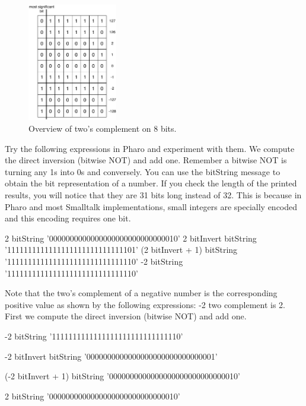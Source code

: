 \documentclass[a4paper,10pt,twoside]{book}
\begin{document}
\begin{figure}[h]
\begin{center}
\includegraphics[width=0.35\textwidth]{8bits-Table}
\caption{Overview of two's complement on 8 bits.\label{negativePositive}}
\end{center}
\end{figure}



Try the following expressions in Pharo and experiment with them. We compute the direct inversion (bitwise NOT) and add one. 
Remember a bitwise NOT is turning any 1s into 0s and conversely. You can use the bitString message to obtain the bit representation of a number. If you check the length of the printed results, you will notice that they are 31 bits long instead of 32. This is because in Pharo and most Smalltalk implementations, small integers are specially encoded and this encoding requires one bit.


\begin{code}{}
2 bitString 
			'0000000000000000000000000000010'
2 bitInvert bitString 
			'1111111111111111111111111111101'
(2 bitInvert + 1) bitString 
			'1111111111111111111111111111110'
-2 bitString 
			'1111111111111111111111111111110'		 
\end{code}


Note that the two's complement of a negative number is the corresponding positive value as shown by the following expressions: -2 two complement is 2. First we compute the direct inversion (bitwise NOT) and add one. 

\begin{code}{}
-2 bitString 
	'1111111111111111111111111111110'
	
-2 bitInvert bitString  
	'0000000000000000000000000000001'
	
(-2 bitInvert + 1) bitString   
	'0000000000000000000000000000010'

2 bitString 
	'0000000000000000000000000000010'
\end{code}
\end{document}
